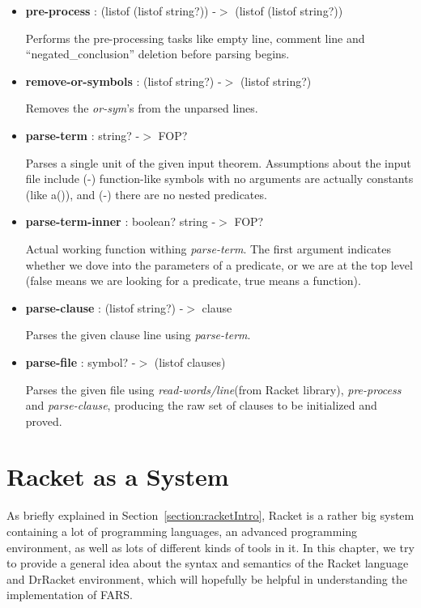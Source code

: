 \documentclass[11pt]{report}
\begin{document}
\begin{appendices}
\begin{itemize}
 \item \textbf{pre-process} : (listof (listof string?)) -$>$ (listof (listof string?))

Performs the pre-processing tasks like empty line, comment line and ``negated\_conclusion'' deletion before parsing begins.

 \item \textbf{remove-or-symbols} : (listof string?) -$>$ (listof string?)

Removes the \textit{or-sym}'s from the unparsed lines.

 \item \textbf{parse-term} : string? -$>$ FOP?

Parses a single unit of the given input theorem. Assumptions about the input file include (-) function-like symbols with no arguments are actually constants (like a()), and (-) there are no nested predicates.

 \item \textbf{parse-term-inner} : boolean? string -$>$ FOP?

Actual working function withing \textit{parse-term}. The first argument indicates whether we dove into the parameters of a predicate, or we are at the top level (false means we are looking for a predicate, true means a function).

 \item \textbf{parse-clause} : (listof string?) -$>$ clause

Parses the given clause line using \textit{parse-term}.

 \item \textbf{parse-file} : symbol? -$>$ (listof clauses)

Parses the given file using \textit{read-words/line}(from Racket library), \textit{pre-process} and \textit{parse-clause}, producing the raw set of clauses to be initialized and proved.

\end{itemize}

\chapter{Racket as a System}
\label{chapter:racket}

As briefly explained in Section~\ref{section:racketIntro}, Racket is a rather big system containing a lot of programming languages, an advanced programming environment, as well as lots of different kinds of tools in it. In this chapter, we try to provide a general idea about the syntax and semantics of the Racket language and DrRacket environment, which will hopefully be helpful in understanding the implementation of FARS.


\end{appendices}
\end{document}
